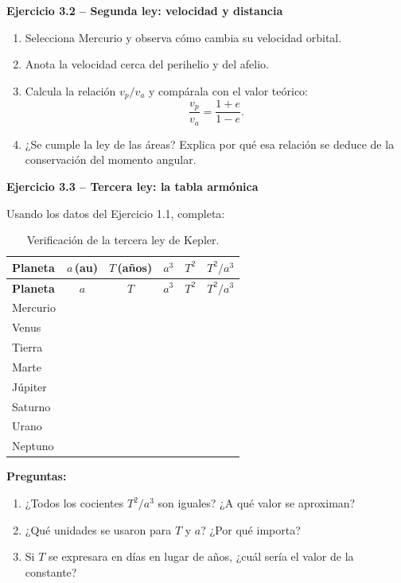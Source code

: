 \documentclass[11pt,a4paper]{article}
\newenvironment{cajaEjercicio}[1][]{\par\medskip\noindent\textbf{#1}\par\smallskip}{\par\medskip}
\theoremstyle{definition}
\begin{document}
\begin{cajaEjercicio}[Ejercicio 3.2 -- Segunda ley: velocidad y distancia]
\begin{enumerate}[label=\alph*),leftmargin=*]
  \item Selecciona Mercurio y observa cómo cambia su velocidad orbital.
  \item Anota la velocidad cerca del perihelio y del afelio.
  \item Calcula la relación $v_{p}/v_{a}$ y compárala con el valor teórico:
  \[
    \frac{v_{p}}{v_{a}} = \frac{1+e}{1-e}.
  \]
  \item ¿Se cumple la ley de las áreas? Explica por qué esa relación se deduce de la conservación del momento angular.
\end{enumerate}
\end{cajaEjercicio}

\begin{cajaEjercicio}[Ejercicio 3.3 -- Tercera ley: la tabla armónica]
Usando los datos del Ejercicio 1.1, completa:

\begin{longtable}{@{}lccccc@{}}
\caption{Verificación de la tercera ley de Kepler.} \\
\toprule
\textbf{Planeta} & $a$\,(\si{\astronomicalunit}) & $T$\,(años) & $a^{3}$ & $T^{2}$ & $T^{2}/a^{3}$ \\
\midrule
\endfirsthead
\toprule
\textbf{Planeta} & $a$ & $T$ & $a^{3}$ & $T^{2}$ & $T^{2}/a^{3}$ \\
\midrule
\endhead
Mercurio & & & & & \\
Venus    & & & & & \\
Tierra   & & & & & \\
Marte    & & & & & \\
Júpiter  & & & & & \\
Saturno  & & & & & \\
Urano    & & & & & \\
Neptuno  & & & & & \\
\bottomrule
\end{longtable}
\end{cajaEjercicio}

\textbf{Preguntas:}
\begin{enumerate}[label=\alph*),leftmargin=*]
  \item ¿Todos los cocientes $T^{2}/a^{3}$ son iguales? ¿A qué valor se aproximan?
  \item ¿Qué unidades se usaron para $T$ y $a$? ¿Por qué importa?
  \item Si $T$ se expresara en días en lugar de años, ¿cuál sería el valor de la constante?
\end{enumerate}
\end{document}
